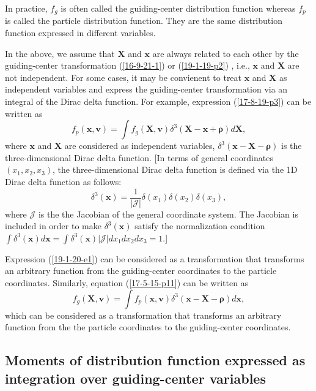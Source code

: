 \documentclass{article}
\newcommand{\tmmathbf}[1]{\ensuremath{\boldsymbol{#1}}}
\begin{document}
In practice, $f_g$ is often called the guiding-center distribution function
whereas $f_p$ is called the particle distribution function. They are the same
distribution function expressed in different variables.

In the above, we assume that $\mathbf{X}$ and $\mathbf{x}$ are always related
to each other by the guiding-center transformation (\ref{16-9-21-1}) or
(\ref{19-1-19-p2}) , i.e., $\mathbf{x}$ and $\mathbf{X}$ are not independent.
For some cases, it may be convienent to treat $\mathbf{x}$ and $\mathbf{X}$ as
independent variables and express the guiding-center transformation via an
integral of the Dirac delta function. For example, expression
(\ref{17-8-19-p3}) can be written as
\begin{equation}
  \label{19-1-20-e1} f_p (\mathbf{x}, \mathbf{v}) = \int f_g (\mathbf{X},
  \mathbf{v}) \delta^3 (\mathbf{X}-\mathbf{x}+\tmmathbf{\rho}) d\mathbf{X},
\end{equation}
where $\mathbf{x}$ and $\mathbf{X}$ are considered as independent variables,
$\delta^3 (\mathbf{x}-\mathbf{X}-\tmmathbf{\rho})$ is the three-dimensional
Dirac delta function. [In terms of general coordinates $(x_1, x_2, x_3)$, the
three-dimensional Dirac delta function is defined via the 1D Dirac delta
function as follows:
\begin{equation}
  \delta^3 (\mathbf{x}) = \frac{1}{| \mathcal{J} |} \delta (x_1) \delta (x_2)
  \delta (x_3),
\end{equation}
where $\mathcal{J}$ is the the Jacobian of the general coordinate system. The
Jacobian is included in order to make $\delta^3 (\mathbf{x})$ satisfy the
normalization condition $\int \delta^3 (\mathbf{x}) d\mathbf{x}= \int \delta^3
(\mathbf{x}) | \mathcal{J} | d x_1 d x_2 d x_3 = 1$.]

Expression (\ref{19-1-20-e1}) can be considered as a transformation that
transforms an arbitrary function from the guiding-center coordinates to the
particle coordinates. Similarly, equation (\ref{17-5-15-p11}) can be written
as
\begin{equation}
  f_g (\mathbf{X}, \mathbf{v}) = \int f_p (\mathbf{x}, \mathbf{v}) \delta^3
  (\mathbf{x}-\mathbf{X}-\tmmathbf{\rho}) d\mathbf{x},
\end{equation}
which can be considered as a transformation that transforms an arbitrary
function from the the particle coordinates to the guiding-center coordinates.

\subsection{Moments of distribution function expressed as integration over
guiding-center variables}
\end{document}

